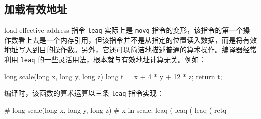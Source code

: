 \subsection{加载有效地址}

load effective address 指令 \verb|leaq| 实际上是 \verb|movq| 指令的变形，该指令的第一个操作数看上去是一个内存引用，但该指令并不是从指定的位置读入数据，而是将有效地址写入到目的操作数。另外，它还可以简洁地描述普通的算术操作。编译器经常利用 \verb|leaq| 的一些灵活用法，根本就与有效地址计算无关。例如：

\begin{cppcode}
long scale(long x, long y, long z) {
  long t = x + 4 * y + 12 * z;
  return t;
}
\end{cppcode}

编译时，该函数的算术运算以三条 \verb|leaq| 指令实现：

\begin{gascode}
# long scale(long x, long y, long z)
# x in %
scale:
    leaq    (%
    leaq    (%
    leaq    (%
    retq
\end{gascode}

\endinput
